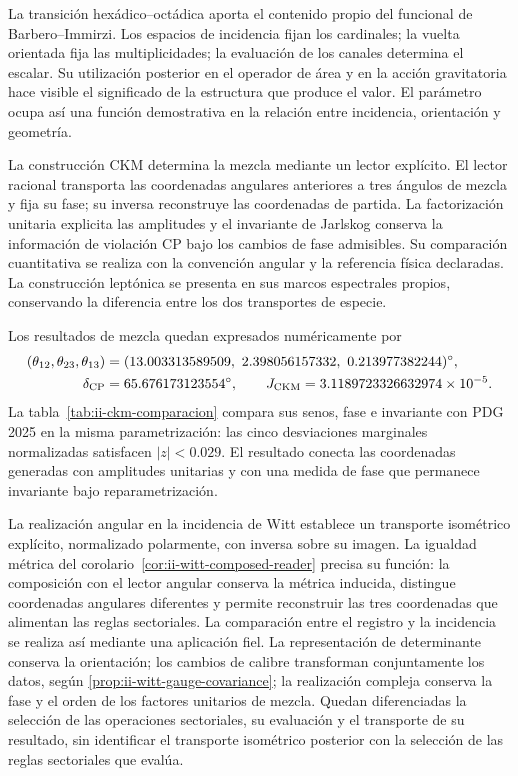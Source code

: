 La transición hexádico--octádica aporta el contenido propio del
funcional de Barbero--Immirzi. Los espacios de incidencia fijan los
cardinales; la vuelta orientada fija las multiplicidades; la evaluación
de los canales determina el escalar. Su utilización posterior en el
operador de área y en la acción gravitatoria hace visible el significado
de la estructura que produce el valor. El parámetro ocupa así una
función demostrativa en la relación entre incidencia, orientación y
geometría.

La construcción CKM determina la mezcla mediante un lector explícito. El
lector racional transporta las coordenadas angulares anteriores a tres
ángulos de mezcla y fija su fase; su inversa reconstruye las coordenadas
de partida. La factorización unitaria explicita las amplitudes y el
invariante de Jarlskog conserva la información de violación CP bajo los
cambios de fase admisibles. Su comparación cuantitativa se realiza con
la convención angular y la referencia física declaradas. La construcción
leptónica se presenta en sus marcos espectrales propios, conservando la
diferencia entre los dos transportes de especie.

Los resultados de mezcla quedan expresados numéricamente por
\begin{align*}
 (\theta_{12},\theta_{23},\theta_{13})
   &=(13.003313589509,\ 2.398056157332,\ 0.213977382244)^\circ,\\
 \delta_{\rm CP}&=65.676173123554^\circ,\qquad
 J_{\rm CKM}=3.1189723326632974\times10^{-5}.
\end{align*}
La tabla~\ref{tab:ii-ckm-comparacion} compara sus senos, fase e
invariante con PDG 2025 en la misma parametrización: las cinco
desviaciones marginales normalizadas satisfacen $|z|<0.029$.
El resultado conecta las coordenadas generadas con amplitudes unitarias
y con una medida de fase que permanece invariante bajo reparametrización.

La realización angular en la incidencia de Witt establece un transporte
isométrico explícito, normalizado polarmente, con inversa sobre su imagen.
La igualdad métrica del corolario~\ref{cor:ii-witt-composed-reader}
precisa su función: la composición con el lector angular conserva la
métrica inducida, distingue coordenadas angulares diferentes y permite
reconstruir las tres coordenadas que alimentan las reglas sectoriales.
La comparación entre el registro y la incidencia se realiza así mediante
una aplicación fiel. La representación de determinante conserva la
orientación; los cambios de calibre transforman conjuntamente los datos,
según \ref{prop:ii-witt-gauge-covariance}; la realización compleja conserva
la fase y el orden de los factores unitarios de mezcla. Quedan diferenciadas
la selección de las operaciones sectoriales, su evaluación y el transporte
de su resultado, sin identificar el transporte isométrico posterior con la selección de
las reglas sectoriales que evalúa.

